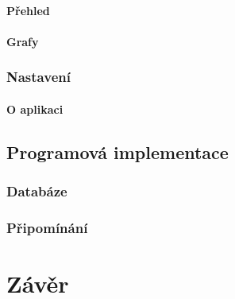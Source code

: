 \documentclass[a4paper,12pt]{report}
\begin{document}
\subsubsection{Přehled}
\subsubsection{Grafy}
\subsection{Nastavení}
\subsubsection{O aplikaci}
\section{Programová implementace}
\subsection{Databáze}
\subsection{Připomínání}

\chapter*{Závěr}
\end{document}
